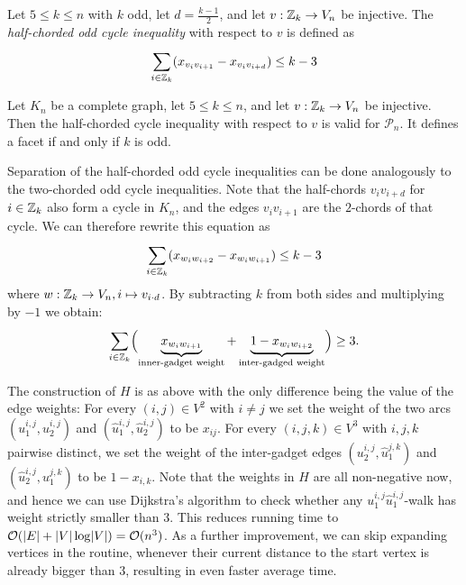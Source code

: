 \begin{definition}\label{def:half-chorded}
	Let $5 \leq k \leq n$ with $k$ odd, let $d = \frac{k-1}{2}$, and let $v: \mathbb{Z}_{k} \to V_{n}$ be injective.
	The \textit{half-chorded odd cycle inequality} with respect to $v$ is defined as
	\begin{equation}\label{eq:half-chorded}
		\sum_{i \in \mathbb{Z}_{k}}^{} (x_{v_{i} v_{i+1}} - x_{v_{i} v_{i+d} }) \leq k - 3
	\end{equation}
\end{definition}
\begin{theorem}
	Let $K_{n}$ be a complete graph, let $5 \leq k \leq n$, and let $v: \mathbb{Z}_{k} \to V_{n}$ be injective.
	Then the half-chorded cycle inequality with respect to $v$ is valid for $\mathscr{P}_{n}$.
	It defines a facet if and only if $k$ is odd.
\end{theorem}
Separation of the half-chorded odd cycle inequalities can be done analogously to the two-chorded odd cycle inequalities. 
Note that the half-chords $v_{i}v_{i+d}$ for $i \in \mathbb{Z}_{k}$ also form a cycle in $K_{n}$, and the edges $v_{i}v_{i+1}$ are the $2$-chords of that cycle.
We can therefore rewrite this equation as
\begin{equation*}
\sum_{i \in \mathbb{Z}_{k}}^{} (x_{w_{i}w_{i+2}} - x_{w_{i}w_{i+1}}) \leq k-3
\end{equation*}
where $w: \mathbb{Z}_{k} \to V_{n}, i \mapsto v_{i \cdot d}$.
By subtracting $k$ from both sides and multiplying by $-1$ we obtain:
\begin{equation*}
	\sum_{i \in \mathbb{Z}_{k}}^{} \Bigl( \underbrace{x_{w_{i}w_{i+1}}}_{\text{inner-gadget weight}} + \underbrace{1 -x_{w_{i}w_{i+2}}}_{\text{inter-gadged weight}} \Bigr) \geq 3.
\end{equation*}

The construction of $H$ is as above with the only difference being the value of the edge weights:
For every $(i,j) \in V^{2}$ with $i \neq j$ we set the weight of the two arcs $(u_{1}^{i,j},u_{2}^{i,j})$ and $(\hat{u}_{1}^{i,j},\hat{u}_{2}^{i,j})$ to be $x_{ij}$.
For every $(i,j,k) \in V^{3}$ with $i,j,k$ pairwise distinct, we set the weight of the inter-gadget edges $(u_{2}^{i,j},\hat{u}_{1}^{j,k})$ and $(\hat{u}_{2}^{i,j}, u_{1}^{j,k})$ to be $1 - x_{i,k}$.
Note that the weights in $H$ are all non-negative now, and hence we can use Dijkstra’s algorithm to check whether any $u_{1}^{i,j}\hat{u}_{1}^{i,j}$-walk has weight strictly smaller than $3$.
This reduces running time to $\mathcal{O}(\lvert E \rvert + \lvert V \rvert \operatorname{\text{log}} \lvert V \rvert) = \mathcal{O}(n^{3})$.
As a further improvement, we can skip expanding vertices in the routine, whenever their current distance to the start vertex is already bigger than $3$, resulting in even faster average time.
